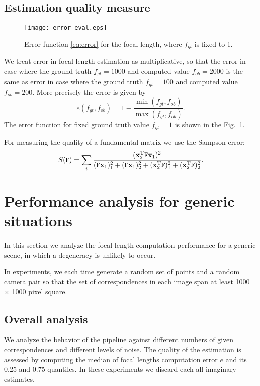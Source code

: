 \subsection{Estimation quality measure}
\begin{figure}[h!]
      \begin{center}
    \texttt{[image: error\_eval.eps]}
    \caption[Focal length error function]{Error function \ref{eq:error} for the focal length, where $f_{gt}$ is fixed to 1.}
    \label{fig:error}
  \end{center}
\end{figure}
We treat error in focal length estimation as multiplicative, so that the error in case where the ground truth $f_{gt}=1000$ and computed value $f_{ob}=2000$ is the same as error in case where the ground truth $f_{gt}=100$ and computed value $f_{ob}=200$. More precisely the error is given by 
\begin{equation}
e(f_{gt},f_{ob})= 1 - \frac{\min(f_{gt}, f_{ob})}{\max(f_{gt}, f_{ob})}.
\label{eq:error}
\end{equation} The error function for fixed ground truth value $f_{gt}=1$ is shown in the Fig.~\ref{fig:error}.  

For measuring the quality of a fundamental matrix we use the Sampson error: 
\begin{equation}
S(\mathtt{F}) = \sum_i \frac{(\mathbf{x}_2^{\text{T}} \mathtt{F} \mathbf{x}_1)^2}{(\mathtt{F} \mathbf{x}_1)_1^2 + (\mathtt{F} \mathbf{x}_1)_2^2 + (\mathbf{x}_2^{\text{T}} \mathtt{F})_1^2 + (\mathbf{x}_2^{\text{T}} \mathtt{F})_2^2}.
\label{eq:sampson}
\end{equation}


\section{Performance analysis for generic situations}

In this section we analyze the focal length computation performance for a generic scene, in which a degeneracy is unlikely to occur. 

In experiments, we each time generate a random set of points and a random camera pair so that the set of correspondences in each image span at least 1000 $\times$ 1000 pixel square. 


\subsection{Overall analysis}
We analyze the behavior of the pipeline against different numbers of given correspondences and different levels of noise. The quality of the estimation is assessed by computing the median of focal lengths computation  error $e$ and its 0.25 and 0.75 quantiles. In these experiments we discard each all imaginary estimates.

